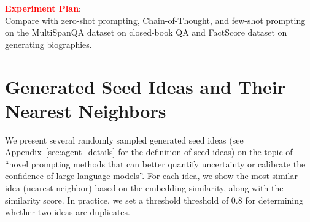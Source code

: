 \textbf{\textcolor{red}{Experiment Plan}}: \\
Compare with zero-shot prompting, Chain-of-Thought, and few-shot prompting on the MultiSpanQA dataset on closed-book QA and FactScore dataset on generating biographies.

\newpage











\section{Generated Seed Ideas and Their Nearest Neighbors}
\label{sec:seed_idea_simiarity}

We present several randomly sampled generated seed ideas (see Appendix~\ref{sec:agent_details} for the definition of seed ideas) on the topic of ``novel prompting methods that can better quantify uncertainty or calibrate the confidence of large language models''. For each idea, we show the most similar idea (nearest neighbor) based on the embedding similarity, along with the similarity score. In practice, we set a threshold threshold of 0.8 for determining whether two ideas are duplicates. 

\vspace{5pt}

